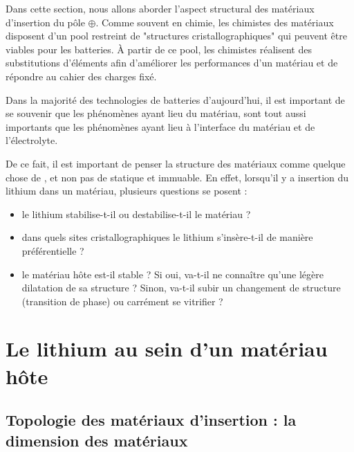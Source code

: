 
Dans cette section, nous allons aborder l'aspect structural des matériaux d'insertion du pôle $\oplus$. Comme souvent en chimie, les chimistes des matériaux disposent d'un pool restreint de "structures cristallographiques" qui peuvent être viables pour les batteries. \`{A} partir de ce pool, les chimistes réalisent des substitutions d'éléments afin d'améliorer les performances d'un matériau et de répondre au cahier des charges fixé.


Dans la majorité des technologies de batteries d'aujourd'hui, il est important de se souvenir que les phénomènes ayant lieu  du matériau, sont tout aussi importants que les phénomènes ayant lieu à l'interface du matériau et de l'électrolyte.

De ce fait, il est important de penser la structure des matériaux comme quelque chose de , et non pas de statique et immuable. En effet, lorsqu'il y a insertion du lithium dans un matériau, plusieurs questions se posent : 
\begin{itemize}
\item le lithium stabilise-t-il ou destabilise-t-il le matériau ? 
\item dans quels sites cristallographiques le lithium s'insère-t-il de manière préférentielle ?
\item le matériau hôte est-il stable ? Si oui, va-t-il ne connaître qu'une légère dilatation de sa structure ? Sinon, va-t-il subir un changement de structure (transition de phase) ou carrément se vitrifier ?
\end{itemize}

\section{Le lithium au sein d'un matériau hôte}

\subsection{Topologie des matériaux d'insertion : la dimension des matériaux}

